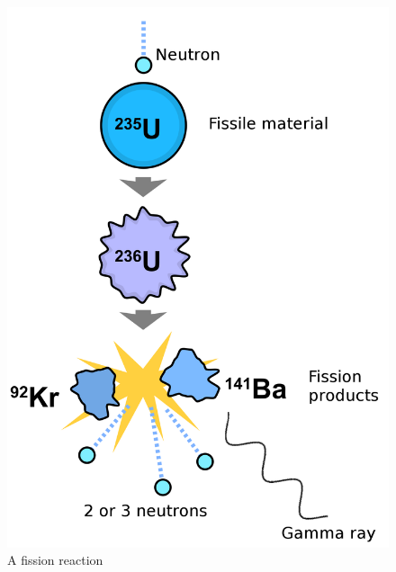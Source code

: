 \begin{figure}
\centering
\includegraphics[scale=0.15]{gfx/nuclear-fission.png}
\caption{\label{fig:nuclear-fission}A fission reaction}
\end{figure}

\begin{singlespace}
    


    \end{singlespace}
